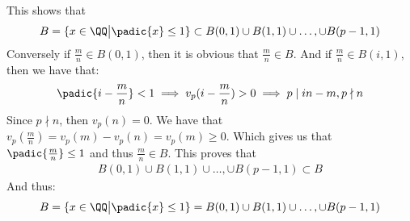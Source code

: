 \begin{enumerate}[label=\ilabel]
        This shows that
        \begin{gather*}
            B = \{x \in \QQ \big| \padic{x} \le 1 \} \subset B(0, 1) \cup B(1, 1) \cup \dots, \cup B(p - 1, 1) 
        \end{gather*}
        Conversely if $\frac{m}{n} \in B(0, 1)$, then it is obvious that $\frac{m}{n} \in B$. And if $\frac{m}{n} \in B(i, 1)$, then we have that:
        \begin{gather*}
            \padic{i - \frac{m}{n}} < 1 \implies v_p(i - \frac{m}{n}) > 0 \implies p \mid in - m ,  p \nmid n
        \end{gather*}
        Since $p \nmid n$, then $v_p(n) = 0$. We have that $v_p(\frac{m}{n}) = v_p(m) - v_p(n) = v_p(m) \ge 0$. Which gives us that $\padic{\frac{m}{n}} \le 1$ and thus $\frac{m}{n} \in B$. This proves that 
        \begin{gather*}
            B(0, 1) \cup B(1, 1) \cup \dots, \cup B(p - 1, 1) \subset B
        \end{gather*}
        And thus:
        \begin{gather*}
            B = \{x \in \QQ \big| \padic{x} \le 1 \} = B(0, 1) \cup B(1, 1) \cup \dots, \cup B(p - 1, 1) 
        \end{gather*}
\end{enumerate}